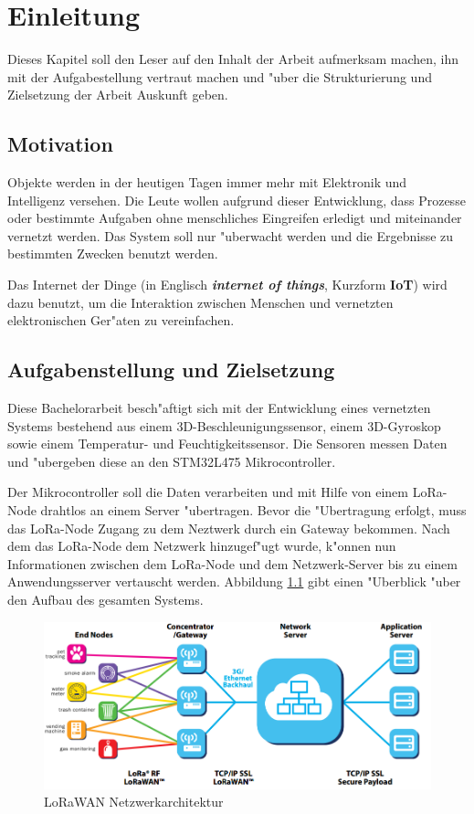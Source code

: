 
\chapter{Einleitung}

Dieses Kapitel soll den Leser auf den Inhalt der Arbeit aufmerksam machen, ihn mit der Aufgabestellung vertraut machen und "uber die Strukturierung und Zielsetzung der Arbeit Auskunft geben.


\section{Motivation}
Objekte werden in der heutigen Tagen immer mehr mit Elektronik und Intelligenz versehen. Die Leute wollen aufgrund dieser Entwicklung, dass Prozesse oder bestimmte Aufgaben ohne menschliches Eingreifen erledigt und miteinander vernetzt werden. Das System soll nur "uberwacht werden und die Ergebnisse zu bestimmten Zwecken benutzt werden.

Das Internet der Dinge (in Englisch \textbf{\textit{internet of things}}, Kurzform \textbf{IoT}) wird dazu benutzt, um die Interaktion zwischen Menschen und vernetzten elektronischen Ger"aten zu vereinfachen. 


\section{Aufgabenstellung und Zielsetzung}
Diese Bachelorarbeit besch"aftigt sich mit der Entwicklung eines vernetzten Systems bestehend aus einem 3D-Beschleunigungssensor, einem 3D-Gyroskop sowie einem Tem\-peratur- und Feuchtigkeitssensor. Die Sensoren messen Daten und "ubergeben diese an den STM32L475 Mikrocontroller.

Der Mikrocontroller soll die Daten verarbeiten und mit Hilfe von einem LoRa-Node\cite{AT_Command} drahtlos an einem Server "ubertragen. Bevor die "Ubertragung erfolgt, muss das LoRa-Node Zugang zu dem Neztwerk durch ein Gateway bekommen. Nach dem das LoRa-Node dem Netzwerk hinzugef"ugt wurde, k"onnen nun Informationen zwischen dem LoRa-Node und dem Netzwerk-Server bis zu einem Anwendungsserver vertauscht werden. Abbildung \ref{LRWAN} gibt einen "Uberblick "uber den Aufbau des gesamten Systems.

\begin{figure}[h]	
	\includegraphics[width=15cm]{source/images/LoRaWAN_NET}
	\caption{LoRaWAN Netzwerkarchitektur \cite{LoRaWAN}}\label{LRWAN}
\end{figure}
\vspace{5cm}

